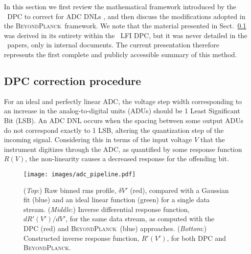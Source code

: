 \documentclass[twocolumn]{aa}
\newcommand{\BP}{\textsc{BeyondPlanck}}
\begin{document}
In this section we first review the mathematical framework introduced by the \Planck\ DPC to correct for ADC DNLs \citep{planck2013-p02}, and then discuss the modifications adopted in the \BP\ framework. We note that the material presented in Sect.~\ref{sub:math} was derived in its entirety within the \Planck\ LFI DPC, but it was never detailed in the \Planck\ papers, only in internal documents. The current presentation therefore represents the first complete and publicly accessible summary of this method.

\subsection{DPC correction procedure}\label{sub:math}

For an ideal and perfectly linear ADC, the voltage step width corresponding to an increase in the analog-to-digital units (ADUs) should be 1 Least Significant Bit (LSB). An ADC DNL occurs when the spacing between some output ADUs do not correspond exactly to 1 LSB, altering the quantization step of the incoming signal. Considering this in terms of the input voltage $V$ that the instrument digitizes through the ADC, as quantified by some response function $R(V)$, the non-linearity causes a decreased response for the offending bit.

\begin{figure}[t]
\texttt{[image: images/adc\_pipeline.pdf]}
\caption{(\emph{Top}:) Raw binned rms profile, $\delta V'$ (red), compared with a Gaussian fit (blue) and an ideal linear function (green) for a single data stream. (\emph{Middle}:) Inverse differential response function, $dR'(V')/dV'$, for the same data stream, as computed with the DPC (red) and \BP\ (blue) approaches.  (\emph{Bottom}:) Constructed inverse response function, $R'(V')$, for both DPC and \BP.}
\label{fig:adc_pipeline}
\end{figure}
\end{document}
